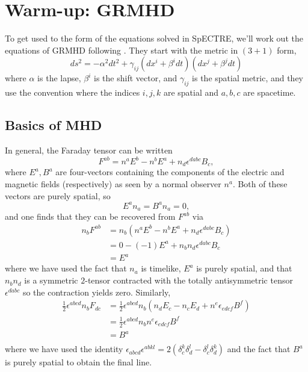 \documentclass[12pt]{article}
\numberwithin{equation}{section}
\begin{document}
\section{Warm-up: GRMHD}

To get used to the form of the equations solved in SpECTRE, we'll work out the
 equations of GRMHD following \cite{Deppe22}.
They start with the metric in $(3+1)$ form,
\begin{equation}
ds^2 = - \alpha^2 dt^2 + \gamma_{ij} (dx^i + \beta^i dt) (dx^j + \beta^j dt)
\end{equation}
where $\alpha$ is the lapse, $\beta^{i}$ is the shift vector, and $\gamma_{ij}$
 is the spatial metric, and they use the convention where the indices $i,j,k$
 are spatial and $a,b,c$ are spacetime.

\subsection{Basics of MHD}

In general, the Faraday tensor can be written
\begin{equation}
F^{ab} = n^a E^b - n^b E^a + n_d \epsilon^{dabc} B_c,
\end{equation}
where $E^a, B^a$ are four-vectors containing the components of the electric and magnetic fields (respectively) as seen by a normal observer $n^a$.
Both of these vectors are purely spatial, so
\begin{equation}
E^a n_a = B^a n_a = 0,
\end{equation}
and one finds that they can be recovered from $F^{ab}$ via
\begin{equation}
\begin{aligned}
n_b F^{ab} &= n_b (n^a E^b - n^b E^a + n_d \epsilon^{dabc} B_c) \\
&= 0 - (-1) E^a + n_b n_d \epsilon^{dabc} B_c \\
&= E^{a}
\end{aligned}
\end{equation}
where we have used the fact that $n_a$ is timelike, $E^{a}$ is purely spatial, and that $n_b n_d$ is a symmetric $2$-tensor contracted with the totally antisymmetric tensor $\epsilon^{dabc}$ so the contraction yields zero.
Similarly, 
\begin{equation}
\begin{aligned}
\frac{1}{2} \epsilon^{abcd} n_b F_{dc} &= \frac{1}{2} \epsilon^{abcd} n_b (n_d E_c - n_c E_d + n^e \epsilon_{edcf} B^f) \\
&= \frac{1}{2} \epsilon^{abcd} n_b n^e \epsilon_{edcf} B^f \\
&= B^a \\
\end{aligned}
\end{equation}
where we have used the identity $\epsilon_{abcd} \epsilon^{abkl} = 2 (\delta^{k}_{c} \delta^{l}_{d} - \delta^{l}_{c} \delta^{k}_{d})$ and the fact that $B^a$ is purely spatial to obtain the final line.
\end{document}
